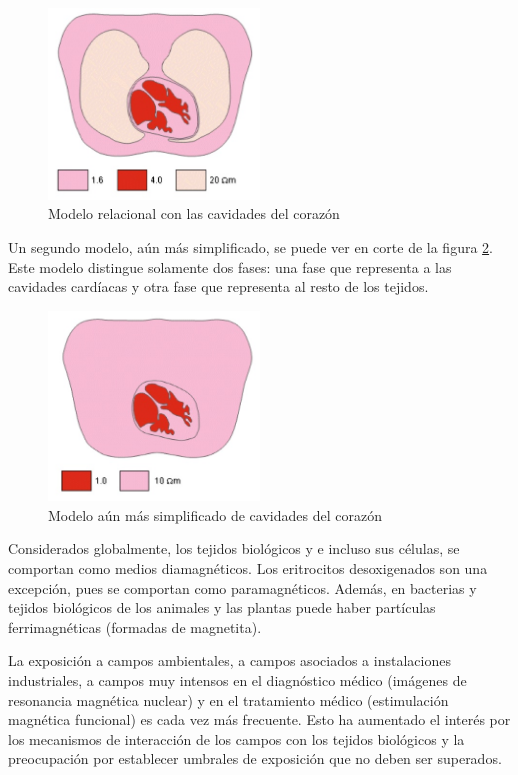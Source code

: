 \begin{figure}[H]
    \centering
    \includegraphics[width=0.5\textwidth]{./Figures/fig61}
	\caption{Modelo relacional con las cavidades del corazón}
	\label{fig:61}
\end{figure}

Un segundo modelo, aún más simplificado, se puede ver en corte de la figura \ref{fig:62}. Este modelo distingue solamente dos fases: una fase que representa a las cavidades cardíacas y otra fase que representa al resto de los tejidos.

\begin{figure}[H]
    \centering
    \includegraphics[width=0.5\textwidth]{./Figures/fig62}
	\caption{Modelo aún más simplificado de cavidades del corazón}
	\label{fig:62}
\end{figure}

Considerados globalmente, los tejidos biológicos y e incluso sus células, se comportan como medios diamagnéticos. Los eritrocitos desoxigenados son una excepción, pues se comportan como paramagnéticos. Además, en bacterias y tejidos biológicos de los animales y las plantas puede haber partículas ferrimagnéticas (formadas de magnetita).

La exposición a campos ambientales, a campos asociados a instalaciones industriales, a campos muy intensos en el diagnóstico médico (imágenes de resonancia magnética nuclear) y en el tratamiento médico (estimulación magnética funcional) es cada vez más frecuente. Esto ha aumentado el interés por los mecanismos de interacción de los campos con los tejidos biológicos y la preocupación por establecer umbrales de exposición que no deben ser superados.

